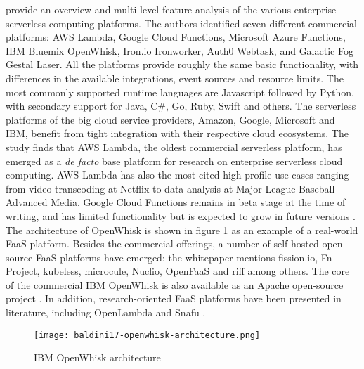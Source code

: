 \textcite{lynn2017preliminary} provide an overview and multi-level feature analysis of the various enterprise serverless computing platforms. The authors identified seven different commercial platforms: AWS Lambda, Google Cloud Functions, Microsoft Azure Functions, IBM Bluemix OpenWhisk, Iron.io Ironworker, Auth0 Webtask, and Galactic Fog Gestal Laser. All the platforms provide roughly the same basic functionality, with differences in the available integrations, event sources and resource limits. The most commonly supported runtime languages are Javascript followed by Python, with secondary support for Java, C\#, Go, Ruby, Swift and others. The serverless platforms of the big cloud service providers, Amazon, Google, Microsoft and IBM, benefit from tight integration with their respective cloud ecosystems. The study finds that AWS Lambda, the oldest commercial serverless platform, has emerged as a \textit{de facto} base platform for research on enterprise serverless cloud computing. AWS Lambda has also the most cited high profile use cases ranging from video transcoding at Netflix to data analysis at Major League Baseball Advanced Media. Google Cloud Functions remains in beta stage at the time of writing, and has limited functionality but is expected to grow in future versions \parencite{google18cloudFunctions}. The architecture of OpenWhisk is shown in figure \ref{fig:openwhisk} as an example of a real-world FaaS platform. Besides the commercial offerings, a number of self-hosted open-source FaaS platforms have emerged: the \textcite{cncf18serverlessWG} whitepaper mentions fission.io, Fn Project, kubeless, microcule, Nuclio, OpenFaaS and riff among others. The core of the commercial IBM OpenWhisk is also available as an Apache open-source project \parencite{ibm18cloudFunctions}. In addition, research-oriented FaaS platforms have been presented in literature, including OpenLambda \parencite{hendrickson16openlambda} and Snafu \parencite{spillner17snafu}.

\begin{figure}[h]
  \centering
  \texttt{[image: baldini17-openwhisk-architecture.png]}
  \caption{IBM OpenWhisk architecture \parencite{baldini17currentTrends}}
  \label{fig:openwhisk}
\end{figure}

